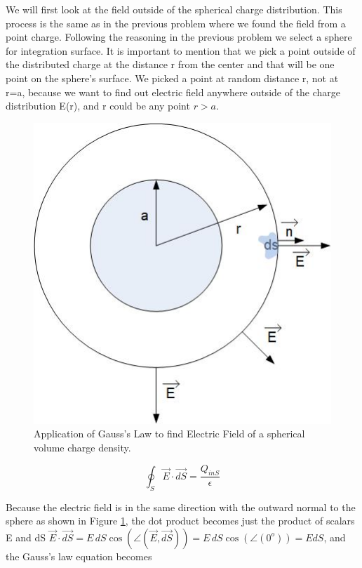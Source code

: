 \documentclass{ximera}
\begin{document}
We will first look at the field  outside of the spherical charge distribution. This process is the same as in the previous problem where we found the field from a point charge. Following the reasoning in the previous problem we select a sphere for integration surface. It is important to mention that we pick a point outside of the distributed charge at the distance r from the center and that will be one point on the sphere's surface. We picked a point at random distance r, not at r=a, because we want to find out electric field anywhere outside of the charge distribution E(r), and r could be any point $r>a$. 

\begin{figure}[htbp]
\begin{center}
\includegraphics[scale=0.6]{../jpg/gaussSphereOut.jpg}
\end{center}
\caption{Application of Gauss's Law to find Electric Field of a spherical volume charge density.}
\label{fig:GaussSphereOut}
\end{figure}



\begin{equation}
\oint_S \vec{E} \cdot \vec{dS} = \frac{Q_{inS}}{\epsilon}
\end{equation}

Because the electric field is in the same direction with the outward normal to the sphere as shown in Figure \ref{fig:GaussSphereOut}, the dot product becomes just the product of scalars E and dS $\vec{E} \cdot \vec{dS}= E \,dS  \cos(\angle(\vec{E},\vec{dS}))= E \,dS  \cos(\angle(0^o)) =E dS$, and the Gauss's law equation becomes 
\end{document}
